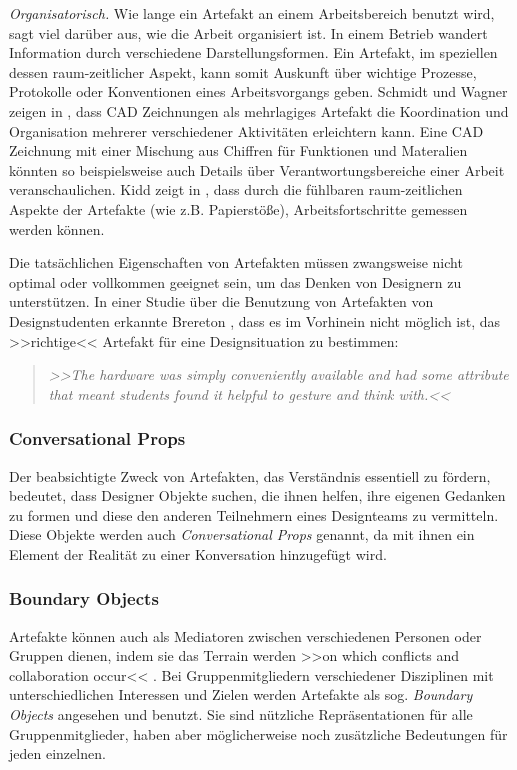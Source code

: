 \medskip \emph{Organisatorisch.} Wie lange ein Artefakt an einem Arbeitsbereich benutzt wird, sagt viel darüber aus, wie die Arbeit organisiert ist. In einem Betrieb wandert Information durch verschiedene Darstellungsformen. Ein Artefakt, im speziellen dessen raum-zeitlicher Aspekt, kann somit Auskunft über wichtige Prozesse, Protokolle oder Konventionen eines Arbeitsvorgangs geben. Schmidt und Wagner zeigen in \citep{Schmidt:2002}, dass \ac{CAD} Zeichnungen als mehrlagiges Artefakt die Koordination und Organisation mehrerer verschiedener Aktivitäten erleichtern kann. Eine \ac{CAD} Zeichnung mit einer Mischung aus Chiffren für Funktionen und Materalien könnten so beispielsweise auch Details über Verantwortungsbereiche einer Arbeit veranschaulichen. Kidd zeigt in \citep{Kidd:1994}, dass durch die fühlbaren raum-zeitlichen Aspekte der Artefakte (wie z.B. Papierstöße), Arbeitsfortschritte gemessen werden können. \citep{Vyas:2008}

\bigskip Die tatsächlichen Eigenschaften von Artefakten müssen zwangsweise nicht optimal oder vollkommen geeignet sein, um das Denken von Designern zu unterstützen. In einer Studie über die Benutzung von Artefakten von Designstudenten erkannte Brereton \citep{Brereton:2000}, dass es im Vorhinein nicht möglich ist, das >>richtige<< Artefakt für eine Designsituation zu bestimmen:

\begin{quote}
	\textsl{>>The hardware was simply conveniently available and had some attribute that meant students found it helpful to gesture and think with.<<}
\begin{flushright}\citep{Brereton:2000}\end{flushright}
\end{quote}

\subsubsection{Conversational Props} 
Der beabsichtigte Zweck von Artefakten, das Verständnis essentiell zu fördern, bedeutet, dass Designer Objekte suchen, die ihnen helfen, ihre eigenen Gedanken zu formen und diese den anderen Teilnehmern eines Designteams zu vermitteln. Diese Objekte werden auch \emph{Conversational Props} \citep{Brinck:1992} genannt, da mit ihnen ein Element der Realität zu einer Konversation hinzugefügt wird. \citep{Larsson:2003}

\subsubsection{Boundary Objects} 
Artefakte können auch als Mediatoren zwischen verschiedenen Personen oder Gruppen dienen, indem sie das Terrain werden >>on which conflicts and collaboration occur<< \citep{Perry:1998}. Bei Gruppenmitgliedern verschiedener Disziplinen mit unterschiedlichen Interessen und Zielen werden Artefakte als sog. \emph{Boundary Objects} \citep{Star:1989} angesehen und benutzt. Sie sind nützliche Repräsentationen für alle Gruppenmitglieder, haben aber möglicherweise noch zusätzliche Bedeutungen für jeden einzelnen. \citep{Larsson:2003}

